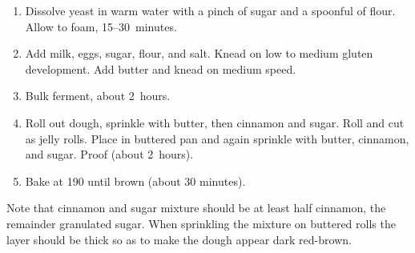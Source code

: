 
\begin{ingredients}
\end{ingredients}


\begin{recipe}
  \begin{enumerate}
  \item Dissolve yeast in warm water with a pinch of sugar and a
    spoonful of flour.  Allow to foam, 15--30~minutes.

  \item Add milk, eggs, sugar, flour, and salt.  Knead on low to
    medium gluten development.  Add butter and knead on medium speed.

  \item Bulk ferment, about 2~hours.

  \item Roll out dough, sprinkle with butter, then cinnamon and sugar.
    Roll and cut as jelly rolls. Place in buttered pan and again sprinkle
    with butter, cinnamon, and sugar.  Proof (about 2~hours).

  \item Bake at 190\degreeC{} until brown (about 30 minutes).

  \end{enumerate}

  Note that cinnamon and sugar mixture should be at least half
  cinnamon, the remainder granulated sugar.  When sprinkling the
  mixture on buttered rolls the layer should be thick so as to make
  the dough appear dark red-brown.
\end{recipe}
